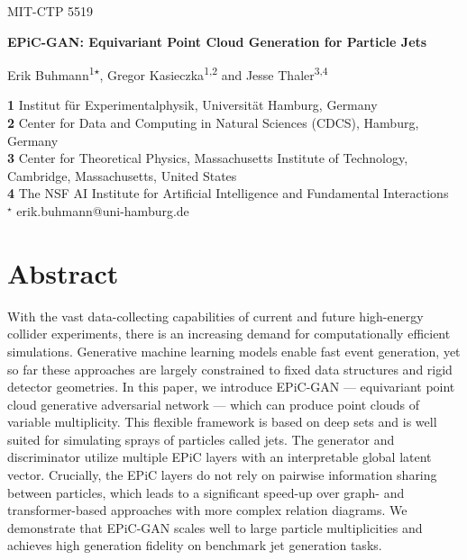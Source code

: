 \documentclass[a4paper,submission, Phys]{SciPost}
\begin{document}
\begin{flushright}
MIT-CTP 5519
\end{flushright}

\begin{center}{\Large \textbf{
EPiC-GAN: Equivariant Point Cloud Generation for Particle Jets\\
}}\end{center}

\begin{center}
Erik Buhmann\textsuperscript{1$\star$},
Gregor Kasieczka\textsuperscript{1,2} and
Jesse Thaler\textsuperscript{3,4}
\end{center}

\begin{center}
\small
{\bf 1} Institut f\"ur Experimentalphysik, Universit\"at Hamburg, Germany
\\
{\bf 2} Center for Data and Computing in Natural Sciences (CDCS), Hamburg, Germany
\\
{\bf 3} Center for Theoretical Physics, Massachusetts Institute of Technology, \\ Cambridge, Massachusetts, United States
\\
{\bf 4} The NSF AI Institute for Artificial Intelligence and Fundamental Interactions
\\
${}^\star$ {\small \sf erik.buhmann@uni-hamburg.de}
\end{center}


\section*{Abstract}
%
{
With the vast data-collecting capabilities of current and future high-energy collider experiments, there is an increasing demand for computationally efficient simulations.
%
Generative machine learning models enable fast event generation, yet so far these approaches are largely constrained to fixed data structures and rigid detector geometries.
%
In this paper, we introduce EPiC-GAN --- equivariant point cloud generative adversarial network --- which can produce point clouds of variable multiplicity.
%
This flexible framework is based on deep sets and is well suited for simulating sprays of particles called jets.
%
The generator and discriminator utilize multiple EPiC layers with an interpretable global latent vector.
%
Crucially, the EPiC layers do not rely on pairwise information sharing between particles, which leads to a significant speed-up over graph- and transformer-based approaches with more complex relation diagrams.
%
We demonstrate that EPiC-GAN scales well to large particle multiplicities and achieves high generation fidelity on benchmark jet generation tasks.
}
\end{document}
